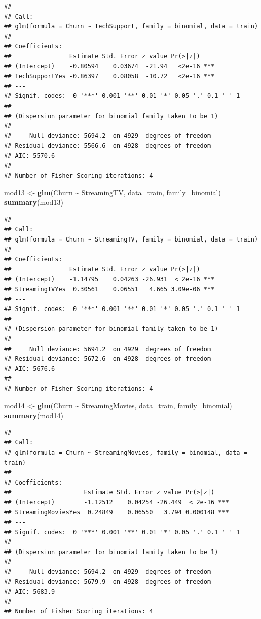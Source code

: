 \documentclass[
  twoside]{article}
\newenvironment{Shaded}{\begin{snugshade}}{\end{snugshade}}
\newcommand{\AttributeTok}[1]{\textcolor[rgb]{0.13,0.29,0.53}{#1}}
\newcommand{\FunctionTok}[1]{\textcolor[rgb]{0.13,0.29,0.53}{\textbf{#1}}}
\newcommand{\NormalTok}[1]{#1}
\newcommand{\OtherTok}[1]{\textcolor[rgb]{0.56,0.35,0.01}{#1}}
\newcommand{\SpecialCharTok}[1]{\textcolor[rgb]{0.81,0.36,0.00}{\textbf{#1}}}
\begin{document}
\begin{verbatim}
## 
## Call:
## glm(formula = Churn ~ TechSupport, family = binomial, data = train)
## 
## Coefficients:
##                Estimate Std. Error z value Pr(>|z|)    
## (Intercept)    -0.80594    0.03674  -21.94   <2e-16 ***
## TechSupportYes -0.86397    0.08058  -10.72   <2e-16 ***
## ---
## Signif. codes:  0 '***' 0.001 '**' 0.01 '*' 0.05 '.' 0.1 ' ' 1
## 
## (Dispersion parameter for binomial family taken to be 1)
## 
##     Null deviance: 5694.2  on 4929  degrees of freedom
## Residual deviance: 5566.6  on 4928  degrees of freedom
## AIC: 5570.6
## 
## Number of Fisher Scoring iterations: 4
\end{verbatim}

\begin{Shaded}
\begin{Highlighting}[]
\NormalTok{mod13 }\OtherTok{\textless{}{-}} \FunctionTok{glm}\NormalTok{(Churn }\SpecialCharTok{\textasciitilde{}}\NormalTok{ StreamingTV, }\AttributeTok{data=}\NormalTok{train, }\AttributeTok{family=}\NormalTok{binomial)}
\FunctionTok{summary}\NormalTok{(mod13)}
\end{Highlighting}
\end{Shaded}

\begin{verbatim}
## 
## Call:
## glm(formula = Churn ~ StreamingTV, family = binomial, data = train)
## 
## Coefficients:
##                Estimate Std. Error z value Pr(>|z|)    
## (Intercept)    -1.14795    0.04263 -26.931  < 2e-16 ***
## StreamingTVYes  0.30561    0.06551   4.665 3.09e-06 ***
## ---
## Signif. codes:  0 '***' 0.001 '**' 0.01 '*' 0.05 '.' 0.1 ' ' 1
## 
## (Dispersion parameter for binomial family taken to be 1)
## 
##     Null deviance: 5694.2  on 4929  degrees of freedom
## Residual deviance: 5672.6  on 4928  degrees of freedom
## AIC: 5676.6
## 
## Number of Fisher Scoring iterations: 4
\end{verbatim}

\begin{Shaded}
\begin{Highlighting}[]
\NormalTok{mod14 }\OtherTok{\textless{}{-}} \FunctionTok{glm}\NormalTok{(Churn }\SpecialCharTok{\textasciitilde{}}\NormalTok{ StreamingMovies, }\AttributeTok{data=}\NormalTok{train, }\AttributeTok{family=}\NormalTok{binomial)}
\FunctionTok{summary}\NormalTok{(mod14)}
\end{Highlighting}
\end{Shaded}

\begin{verbatim}
## 
## Call:
## glm(formula = Churn ~ StreamingMovies, family = binomial, data = train)
## 
## Coefficients:
##                    Estimate Std. Error z value Pr(>|z|)    
## (Intercept)        -1.12512    0.04254 -26.449  < 2e-16 ***
## StreamingMoviesYes  0.24849    0.06550   3.794 0.000148 ***
## ---
## Signif. codes:  0 '***' 0.001 '**' 0.01 '*' 0.05 '.' 0.1 ' ' 1
## 
## (Dispersion parameter for binomial family taken to be 1)
## 
##     Null deviance: 5694.2  on 4929  degrees of freedom
## Residual deviance: 5679.9  on 4928  degrees of freedom
## AIC: 5683.9
## 
## Number of Fisher Scoring iterations: 4
\end{verbatim}
\end{document}
